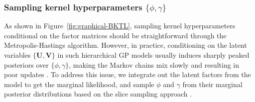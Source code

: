 \documentclass[12pt]{article}
\begin{document}
\subsubsection{Sampling kernel hyperparameters $\{\phi,\gamma\}$}
As shown in Figure~\ref{fig:graphical-BKTL}, sampling kernel hyperparameters conditional on the factor matrices should be straightforward through the Metropolis-Hastings algorithm. However, in practice, conditioning on the latent variables $\{\boldsymbol{U},\boldsymbol{V}\}$ in such hierarchical GP models usually induces sharply peaked posteriors over $\{\phi,\gamma\}$, making the Markov chains mix slowly and resulting in poor updates \citep{murray2010slice}. To address this issue, we integrate out the latent factors from the model to get the marginal likelihood, and sample $\phi$ and $\gamma$ from their marginal posterior distributions based on the slice sampling approach \citep{neal2003slice}.






\end{document}

